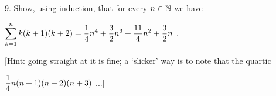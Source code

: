 \documentclass[12pt]{article}
\begin{document}
\begin{description}
\item{9.} Show, using induction, that for every $n\in{\mathbb N}$ we have 

\ssk

\hskip1in $\displaystyle \sum_{k=1}^n k(k+1)(k+2) = {{1}\over{4}}n^4+{{3}\over{2}}n^3+{{11}\over{4}}n^2+{{3}\over{2}}n$ .

\ssk

\item{\spc} [Hint: going straight at it is fine; a `slicker' way is to note that the quartic 

\ssk

\hskip1in $\displaystyle {{1}\over{4}}n(n+1)(n+2)(n+3)$ ...]

\end{description}
\vfill
\end{document}
